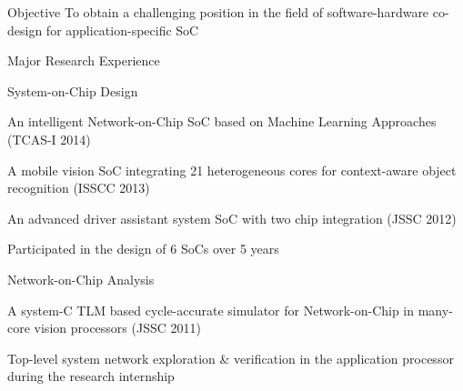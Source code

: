 \documentclass{resume} %
\begin{document}
\begin{section}{Objective}
To obtain a challenging position in the field of software-hardware co-design for application-specific SoC
\end{section}


\begin{section}{Major Research Experience}

\begin{subsection}{System-on-Chip Design}{}{}{}
\item An intelligent Network-on-Chip SoC based on Machine Learning Approaches (TCAS-I 2014)
\item A mobile vision SoC integrating 21 heterogeneous cores for context-aware object recognition (ISSCC 2013)
\item An advanced driver assistant system SoC with two chip integration (JSSC 2012)
\item Participated in the design of 6 SoCs over 5 years
\end{subsection}

\begin{subsection}{Network-on-Chip Analysis}{}{}{}
\item A system-C TLM based cycle-accurate simulator for Network-on-Chip in many-core vision processors (JSSC 2011)
\item Top-level system network exploration \& verification in the application processor during the research internship
\end{subsection}


\end{section}

\end{document}

